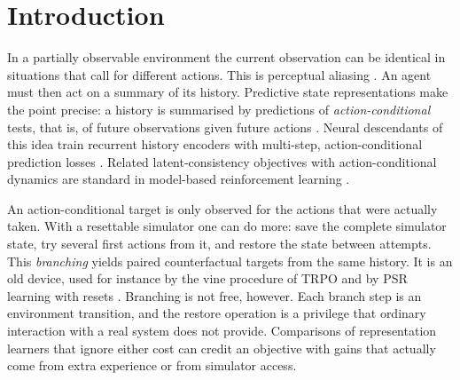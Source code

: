 \section{Introduction}
\label{sec:intro}

In a partially observable environment the current observation can be identical in situations that call for different actions. This is perceptual aliasing \citep{whitehead1991aliasing,mccallum1996thesis}. An agent must then act on a summary of its history. Predictive state representations make the point precise: a history is summarised by predictions of \emph{action-conditional} tests, that is, of future observations given future actions \citep{littman2001psr,singh2004psr}. Neural descendants of this idea train recurrent history encoders with multi-step, action-conditional prediction losses \citep{gregor2019simcore,guo2018belief,guo2020pbl,kwon2024future}. Related latent-consistency objectives with action-conditional dynamics are standard in model-based reinforcement learning \citep{schwarzer2021spr,hansen2024tdmpc2,schrittwieser2020muzero}.

An action-conditional target is only observed for the actions that were actually taken. With a resettable simulator one can do more: save the complete simulator state, try several first actions from it, and restore the state between attempts. This \emph{branching} yields paired counterfactual targets from the same history. It is an old device, used for instance by the vine procedure of TRPO \citep{schulman2015trpo} and by PSR learning with resets \citep{james2004reset}. Branching is not free, however. Each branch step is an environment transition, and the restore operation is a privilege that ordinary interaction with a real system does not provide. Comparisons of representation learners that ignore either cost can credit an objective with gains that actually come from extra experience or from simulator access.


